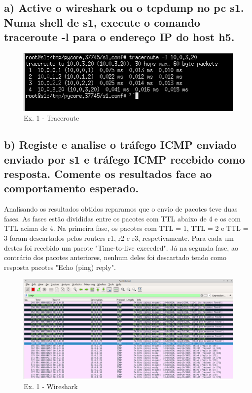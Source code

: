 \documentclass[a4paper]{report}
\begin{document}
\subsection{a) Active o wireshark ou o tcpdump no pc s1. Numa shell de s1, execute o comando
traceroute -l para o endereço IP do host h5.}

\begin{figure}[H]
    \centering 
    \includegraphics[width=\textwidth]{images/traceroutEx1.png}  
    \caption{Ex. 1 - Traceroute}
    \label{fig:traceroutEx1}
\end{figure}

\subsection{b) Registe e analise o tráfego ICMP enviado enviado por s1 e tráfego ICMP
recebido como resposta. Comente os resultados face ao comportamento esperado.}

Analisando os resultados obtidos reparamos que o envio de pacotes teve duas fases.
As fases estão divididas entre os pacotes com TTL abaixo de 4 e os com TTL acima de 4.
Na primeira fase, os pacotes com TTL = 1, TTL = 2 e TTL = 3 foram descartados pelos
routers r1, r2 e r3, respetivamente. Para cada um destes foi recebido um pacote 
"Time-to-live exceeded". Já na segunda fase, ao contrário dos pacotes anteriores, nenhum deles foi descartado tendo como resposta pacotes "Echo (ping) reply".

\begin{figure}[H]
    \centering 
    \includegraphics[width=\textwidth]{images/wiresharkEx1.png}  
    \caption{Ex. 1 - Wireshark}
    \label{fig:wiresharkEx1}
\end{figure}
\end{document}
